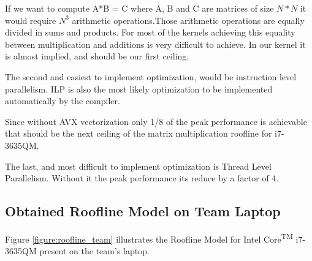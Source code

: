 \documentclass{sigplanconf}
\begin{document}
If we want to compute A*B = C where A, B and C are matrices of size $N * N$ it would require $N^{3}$ arithmetic operations.Those arithmetic operations are equally divided in sums and products. For most of the kernels achieving this equality between multiplication and additions is very difficult to achieve. In our kernel it is almost implied, and should be our first ceiling.
\par  The second and easiest to implement optimization, would be instruction level parallelism. ILP is also the most likely optimization to be implemented automatically by the compiler.\par
Since without AVX vectorization only 1/8 of the peak performance is achievable that should be the next ceiling of the matrix multiplication roofline for  i7-3635QM.\par 
The last, and most difficult to implement optimization is Thread Level Parallelism. Without it the peak performance its reduce by a factor of 4.

\subsection{Obtained Roofline Model on Team Laptop}

Figure \ref{figure:roofline_team}
illustrates the Roofline Model for Intel\textsuperscript{\textregistered} Core\textsuperscript{TM} i7-3635QM present on the team's laptop.\\\par 
\end{document}
